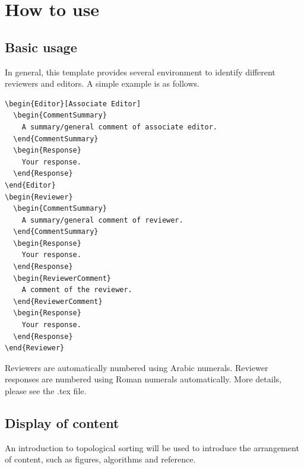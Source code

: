\section{How to use}

\subsection{Basic usage}

In general, this template provides several environment to identify different reviewers and editors.
A simple example is as follows.

\begin{verbatim}
\begin{Editor}[Associate Editor]
  \begin{CommentSummary}
    A summary/general comment of associate editor.
  \end{CommentSummary}
  \begin{Response}
    Your response.
  \end{Response}
\end{Editor}
\begin{Reviewer}
  \begin{CommentSummary}
    A summary/general comment of reviewer.
  \end{CommentSummary}
  \begin{Response}
    Your response.
  \end{Response}
  \begin{ReviewerComment}
    A comment of the reviewer.
  \end{ReviewerComment}
  \begin{Response}
    Your response.
  \end{Response}
\end{Reviewer}
\end{verbatim}

Reviewers are automatically numbered using Arabic numerals.
Reviewer responses are numbered using Roman numerals automatically.
More details, please see the .tex file.

\subsection{Display of content}

An introduction to topological sorting will be used to introduce the arrangement of content, such as figures, algorithms and reference.

